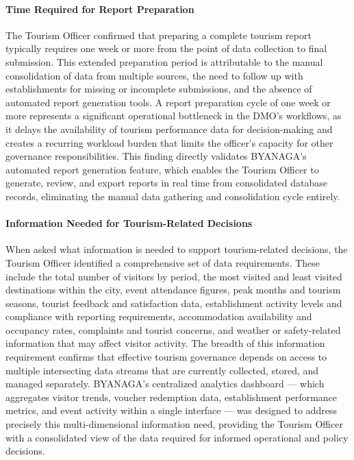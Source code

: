 \documentclass{research}
\begin{document}

\paragraph{Time Required for Report Preparation}

The Tourism Officer confirmed that preparing a complete tourism report
typically requires one week or more from the point of data collection to
final submission. This extended preparation period is attributable to the
manual consolidation of data from multiple sources, the need to follow up with
establishments for missing or incomplete submissions, and the absence of
automated report generation tools. A report preparation cycle of one week or
more represents a significant operational bottleneck in the DMO's workflows,
as it delays the availability of tourism performance data for decision-making
and creates a recurring workload burden that limits the officer's capacity for
other governance responsibilities. This finding directly validates BYANAGA's
automated report generation feature, which enables the Tourism Officer to
generate, review, and export reports in real time from consolidated database
records, eliminating the manual data gathering and consolidation cycle
entirely.


\paragraph{Information Needed for Tourism-Related Decisions}

When asked what information is needed to support tourism-related decisions,
the Tourism Officer identified a comprehensive set of data requirements. These
include the total number of visitors by period, the most visited and least
visited destinations within the city, event attendance figures, peak months
and tourism seasons, tourist feedback and satisfaction data, establishment
activity levels and compliance with reporting requirements, accommodation
availability and occupancy rates, complaints and tourist concerns, and
weather or safety-related information that may affect visitor activity. The
breadth of this information requirement confirms that effective tourism
governance depends on access to multiple intersecting data streams that are
currently collected, stored, and managed separately. BYANAGA's centralized
analytics dashboard --- which aggregates visitor trends, voucher redemption
data, establishment performance metrics, and event activity within a single
interface --- was designed to address precisely this multi-dimensional
information need, providing the Tourism Officer with a consolidated view of
the data required for informed operational and policy decisions.
\end{document}
